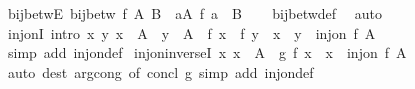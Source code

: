 \begin{isabellebody}
\endisatagproof
{\isafoldproof}%
%
\isadelimproof
\isanewline
%
\endisadelimproof
\isanewline
{}\isamarkupfalse%
\ bij{\isacharunderscore}{\kern0pt}betwE{\isacharcolon}{\kern0pt}\ {\isachardoublequoteopen}bij{\isacharunderscore}{\kern0pt}betw\ f\ A\ B\ {\isasymLongrightarrow}\ {\isasymforall}a{\isasymin}A{\isachardot}{\kern0pt}\ f\ a\ {\isasymin}\ B{\isachardoublequoteclose}\isanewline
%
\isadelimproof
\ \ %
\endisadelimproof
%
\isatagproof
{}\isamarkupfalse%
\ bij{\isacharunderscore}{\kern0pt}betw{\isacharunderscore}{\kern0pt}def\ \isamarkupfalse%
\ auto%
\endisatagproof
{\isafoldproof}%
%
\isadelimproof
\isanewline
%
\endisadelimproof
\isanewline
{}\isamarkupfalse%
\ inj{\isacharunderscore}{\kern0pt}onI\ {\isacharbrackleft}{\kern0pt}intro{\isacharquery}{\kern0pt}{\isacharbrackright}{\kern0pt}{\isacharcolon}{\kern0pt}\ {\isachardoublequoteopen}{\isacharparenleft}{\kern0pt}{\isasymAnd}x\ y{\isachardot}{\kern0pt}\ x\ {\isasymin}\ A\ {\isasymLongrightarrow}\ y\ {\isasymin}\ A\ {\isasymLongrightarrow}\ f\ x\ {\isacharequal}{\kern0pt}\ f\ y\ {\isasymLongrightarrow}\ x\ {\isacharequal}{\kern0pt}\ y{\isacharparenright}{\kern0pt}\ {\isasymLongrightarrow}\ inj{\isacharunderscore}{\kern0pt}on\ f\ A{\isachardoublequoteclose}\isanewline
%
\isadelimproof
\ \ %
\endisadelimproof
%
\isatagproof
{}\isamarkupfalse%
\ {\isacharparenleft}{\kern0pt}simp\ add{\isacharcolon}{\kern0pt}\ inj{\isacharunderscore}{\kern0pt}on{\isacharunderscore}{\kern0pt}def{\isacharparenright}{\kern0pt}%
\endisatagproof
{\isafoldproof}%
%
\isadelimproof
\isanewline
%
\endisadelimproof
\isanewline
{}\isamarkupfalse%
\ inj{\isacharunderscore}{\kern0pt}on{\isacharunderscore}{\kern0pt}inverseI{\isacharcolon}{\kern0pt}\ {\isachardoublequoteopen}{\isacharparenleft}{\kern0pt}{\isasymAnd}x{\isachardot}{\kern0pt}\ x\ {\isasymin}\ A\ {\isasymLongrightarrow}\ g\ {\isacharparenleft}{\kern0pt}f\ x{\isacharparenright}{\kern0pt}\ {\isacharequal}{\kern0pt}\ x{\isacharparenright}{\kern0pt}\ {\isasymLongrightarrow}\ inj{\isacharunderscore}{\kern0pt}on\ f\ A{\isachardoublequoteclose}\isanewline
%
\isadelimproof
\ \ %
\endisadelimproof
%
\isatagproof
{}\isamarkupfalse%
\ {\isacharparenleft}{\kern0pt}auto\ dest{\isacharcolon}{\kern0pt}\ arg{\isacharunderscore}{\kern0pt}cong\ {\isacharbrackleft}{\kern0pt}of\ concl{\isacharcolon}{\kern0pt}\ g{\isacharbrackright}{\kern0pt}\ simp\ add{\isacharcolon}{\kern0pt}\ inj{\isacharunderscore}{\kern0pt}on{\isacharunderscore}{\kern0pt}def{\isacharparenright}{\kern0pt}%
\endisatagproof

\end{isabellebody}
